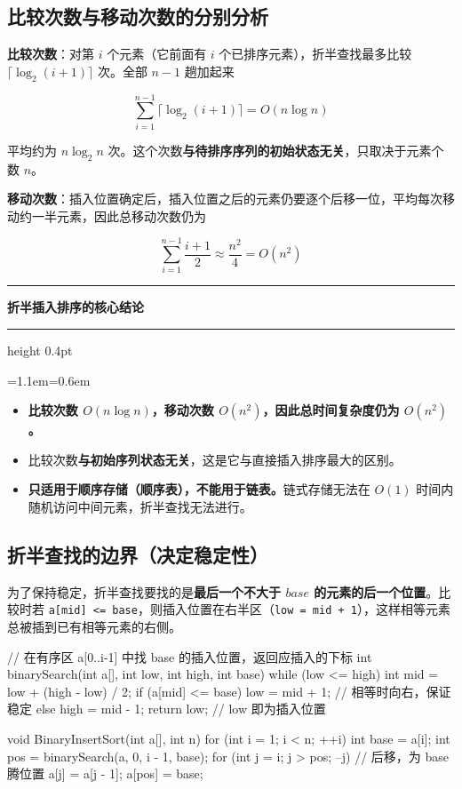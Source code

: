 \documentclass[11pt,openany,UTF8]{ctexbook}
\newcommand{\callouthead}[2]{%
  \par\addvspace{7pt}\noindent
  {\color{#1}\rule[-0.15em]{3pt}{1.05em}}\hspace{0.5em}%
  {\bfseries\color{#1}#2}\par\nobreak\vspace{-0.35em}%
  {\color{rulesep}\hrule height 0.4pt}\nobreak\vspace{0.45em}%
  \begingroup\small\setlength{\parindent}{0pt}%
  \leftskip=1.1em\rightskip=0.6em\noindent\ignorespaces}
\newcommand{\calloutend}{\par\endgroup\addvspace{7pt}}
\newenvironment{callkey}[1]{\callouthead{keybar}{#1}}{\calloutend}
\begin{document}
\subsection{比较次数与移动次数的分别分析}

\textbf{比较次数}：对第 $i$ 个元素（它前面有 $i$ 个已排序元素），折半查找最多比较 $\lceil\log_2(i+1)\rceil$ 次。全部 $n-1$ 趟加起来

\[\sum_{i=1}^{n-1}\lceil\log_2(i+1)\rceil = O(n\log n)\]

平均约为 $n\log_2 n$ 次。这个次数\textbf{与待排序序列的初始状态无关}，只取决于元素个数 $n$。

\textbf{移动次数}：插入位置确定后，插入位置之后的元素仍要逐个后移一位，平均每次移动约一半元素，因此总移动次数仍为

\[\sum_{i=1}^{n-1}\frac{i+1}{2}\approx\frac{n^2}{4}=O(n^2)\]

\begin{callkey}{折半插入排序的核心结论}
\begin{itemize}
\item \textbf{比较次数 $O(n\log n)$，移动次数 $O(n^2)$，因此总时间复杂度仍为 $O(n^2)$。}
\item 比较次数\textbf{与初始序列状态无关}，这是它与直接插入排序最大的区别。
\item \textbf{只适用于顺序存储（顺序表），不能用于链表。}链式存储无法在 $O(1)$ 时间内随机访问中间元素，折半查找无法进行。
\end{itemize}
\end{callkey}

\subsection{折半查找的边界（决定稳定性）}

为了保持稳定，折半查找要找的是\textbf{最后一个不大于 $base$ 的元素的后一个位置}。比较时若 \texttt{a[mid]\allowbreak{} <\allowbreak{}=\allowbreak{} base}，则插入位置在右半区（\texttt{low =\allowbreak{} mid +\allowbreak{} 1}），这样相等元素总被插到已有相等元素的右侧。

\begin{codebox}
// 在有序区 a[0..i-1] 中找 base 的插入位置，返回应插入的下标
int binarySearch(int a[], int low, int high, int base) {
    while (low <= high) {
        int mid = low + (high - low) / 2;
        if (a[mid] <= base) low = mid + 1;   // 相等时向右，保证稳定
        else high = mid - 1;
    }
    return low;   // low 即为插入位置
}

void BinaryInsertSort(int a[], int n) {
    for (int i = 1; i < n; ++i) {
        int base = a[i];
        int pos = binarySearch(a, 0, i - 1, base);
        for (int j = i; j > pos; --j)   // 后移，为 base 腾位置
            a[j] = a[j - 1];
        a[pos] = base;
    }
}
\end{codebox}
\end{document}
